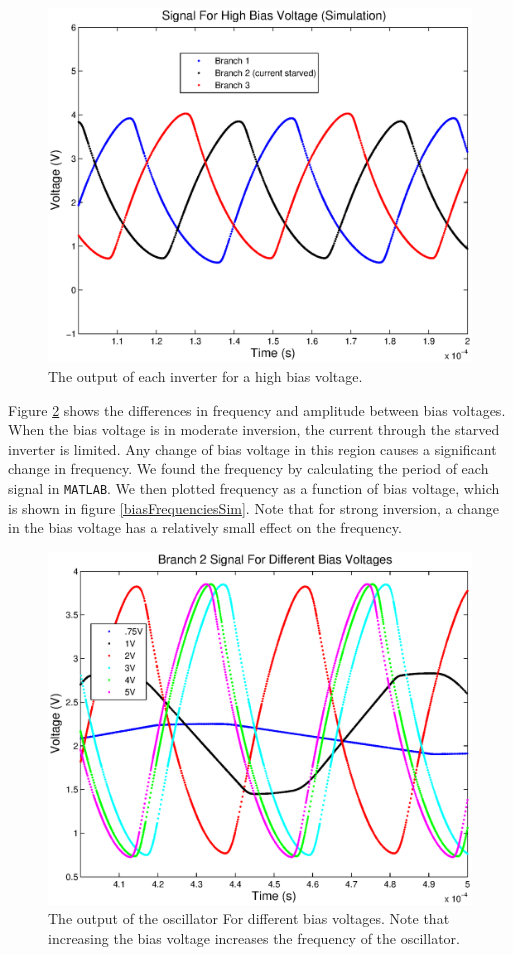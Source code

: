 \documentclass{article}
\begin{document}
\begin{figure}[H]
\centering
\includegraphics[scale=.7]{highBiasSigSim.eps}
\caption{The output of each inverter for a high bias voltage.}
\label{highBiasSigSim}
\end{figure}

Figure \ref{branch2DiffBiasSim} shows the differences in frequency and amplitude between bias voltages. When the bias voltage is in moderate inversion, the current through the starved inverter is limited. Any change of bias voltage in this region causes a significant change in frequency. We found the frequency by calculating the period of each signal in \texttt{MATLAB}. We then plotted frequency as a function of bias voltage, which is shown in figure \ref{biasFrequenciesSim}. Note that for strong inversion, a change in the bias voltage has a relatively small effect on the frequency. 

\begin{figure}[H]
\centering
\includegraphics[scale=.7]{branch2DiffBiasSim.eps}
\caption{The output of the oscillator For different bias voltages. Note that increasing the bias voltage increases the frequency of the oscillator.}
\label{branch2DiffBiasSim}
\end{figure}
\end{document}
